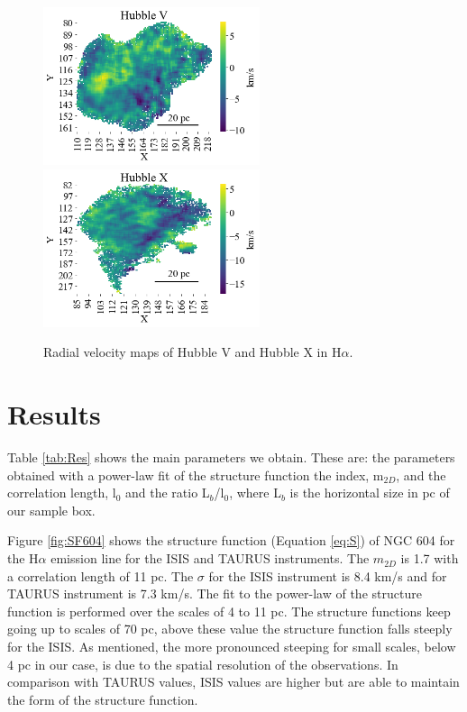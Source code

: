 \documentclass[fleqn,usenatbib]{mnras}
\begin{document}
\begin{figure}
\centering 
\includegraphics[width=2.5in]{Figures/MV.png}
\includegraphics[width=2.5in]{Figures/MX.png}
\caption{Radial velocity maps of Hubble V and Hubble X in H$\alpha$.}
\label{fig:MHub}
\end{figure}

\section{Results}\label{sec:res}

Table \ref{tab:Res} shows the main parameters we obtain. These are: the parameters obtained with a power-law fit of the structure function the index, m$_{2D}$, and the correlation length, l$_{0}$ and the ratio L$_{b}$/l$_{0}$, where L$_{b}$ is the horizontal size in pc of our sample box.  

Figure \ref{fig:SF604} shows the structure function (Equation \ref{eq:S}) of NGC 604 for the H$\alpha$ emission line for the ISIS and TAURUS instruments. The $m_{2D}$ is 1.7 with a correlation length of 11 pc. The $\sigma$ for the ISIS instrument is 8.4 km/s and for TAURUS instrument is 7.3 km/s. The fit to the power-law of the structure function is performed over the scales of 4 to 11 pc. The structure functions keep going up to scales of 70 pc, above these value the structure function falls steeply for the ISIS. As \cite{arthur2016turbulence} mentioned, the more pronounced steeping for small scales, below 4 pc in our case, is due to the spatial resolution of the observations. In comparison with TAURUS values, ISIS values are higher but are able to maintain the form of the structure function. 
\end{document}

